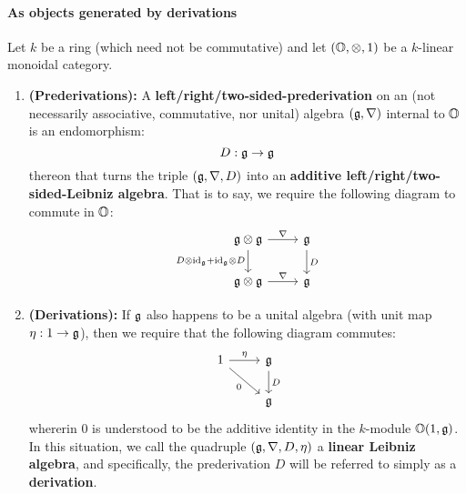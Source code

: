                 \paragraph{As objects generated by derivations}
                    \begin{definition} \label{def: derivations}
                        Let $k$ be a ring (which need not be commutative) and let $(\O, \tensor, 1)$ be a $k$-linear monoidal category. 
                            \begin{enumerate}
                                \item \textbf{(Prederivations):} A \textbf{left/right/two-sided-prederivation} on an (not necessarily associative, commutative, nor unital) algebra $\left(\mathfrak{g}, \nabla\right)$ internal to $\mathbb{O}$ is an endomorphism:
                                    $$D: \mathfrak{g} \to \mathfrak{g}$$
                                thereon that turns the triple $\left(\mathfrak{g}, \nabla, D\right)$ into an \textbf{additive left/right/two-sided-Leibniz algebra}. That is to say, we require the following diagram to commute in $\mathbb{O}$:
                                    $$
                                        \begin{tikzcd}
                                        	{\g \tensor \g} & {\g} \\
                                        	{\g \tensor \g} & {\g}
                                        	\arrow["{D}", from=1-2, to=2-2]
                                        	\arrow["{\nabla}", from=2-1, to=2-2]
                                        	\arrow["{\nabla}", from=1-1, to=1-2]
                                        	\arrow["{D \tensor \id_{\g} + \id_{\g} \tensor D}"', from=1-1, to=2-1]
                                        \end{tikzcd}
                                    $$
                                \item \textbf{(Derivations):} If $\mathfrak{g}$ also happens to be a unital algebra (with unit map $\eta: 1 \to \mathfrak{g}$), then we require that the following diagram commutes:
                                    $$
                                        \begin{tikzcd}
                                        	{1} & {\g} \\
                                        	& {\g}
                                        	\arrow["{D}", from=1-2, to=2-2]
                                        	\arrow["{\eta}", from=1-1, to=1-2]
                                        	\arrow["{0}"', from=1-1, to=2-2]
                                        \end{tikzcd}
                                    $$
                                whererin $0$ is understood to be the additive identity in the $k$-module $\mathbb{O}(1, \mathfrak{g})$. In this situation, we call the quadruple $(\mathfrak{g}, \nabla, D, \eta)$ a \textbf{linear Leibniz algebra}, and specifically, the prederivation $D$ will be referred to simply as a \textbf{derivation}.
                            \end{enumerate}
                    \end{definition}
